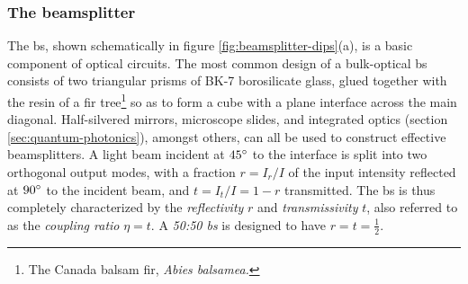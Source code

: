 \subsubsection{The beamsplitter}
\label{sec:beamsplitter}

The \gls{bs}, shown schematically in figure \ref{fig:beamsplitter-dips}(a), is a basic component of optical circuits.  The most common design of a bulk-optical \gls{bs} consists of two triangular prisms of BK-7 borosilicate glass, glued together with the resin of a fir tree\footnote{The Canada balsam fir, \emph{Abies balsamea.}} so as to form a cube with a plane interface across the main diagonal. Half-silvered mirrors, microscope slides, and integrated optics (section \ref{sec:quantum-photonics}), amongst others, can all be used to construct effective beamsplitters. A light beam incident at $45^{\circ}$ to the interface is split into two orthogonal output modes, with a fraction 
$r=I_r/I$ of the input intensity reflected at $90^{\circ}$ to the incident beam,
and $t=I_t/I=1-r$ transmitted. 
The \gls{bs} is thus completely characterized by the \emph{reflectivity} $r$ and \emph{transmissivity} $t$, also referred to as the \emph{coupling ratio} $\eta=t$.
A \emph{50:50 \gls{bs}} is designed to have $r=t=\frac{1}{2}$. 

